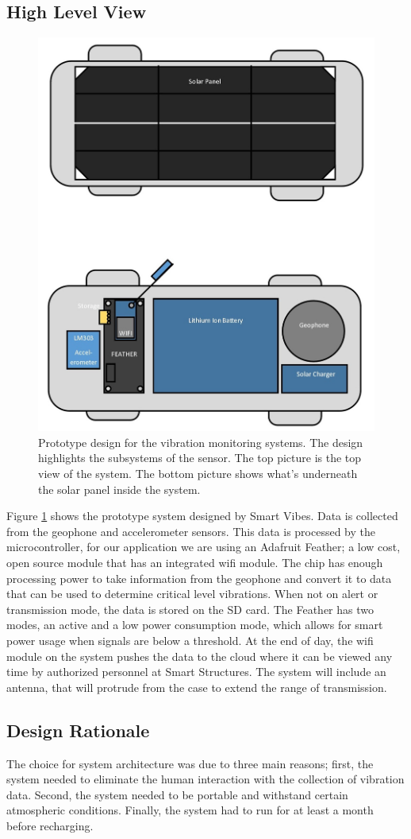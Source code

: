 \documentclass[12pt]{article}
\begin{document}
\subsection{High Level View}
\begin{figure}[H]
    \centering
    \includegraphics[width=.6\textwidth]{src/design_v2.jpg}
    \caption{Prototype design for the vibration monitoring systems. The design highlights the subsystems of the sensor. The top picture is the top view of the system. The bottom picture shows what's underneath the solar panel inside the system.}
    \label{fig:design_v2}
\end{figure}

Figure \ref{fig:design_v2} shows the prototype system designed by Smart Vibes. Data is collected from the geophone and accelerometer sensors. This data is processed by the microcontroller, for our application we are using an Adafruit Feather; a low cost, open source module that has an integrated wifi module. The chip has enough processing power to take information from the geophone and convert it to data that can be used to determine critical level vibrations. When not on alert or transmission mode, the data is stored on the SD card. The Feather has two modes, an active and a low power consumption mode, which allows for smart power usage when signals are below a threshold. At the end of day, the wifi module on the system pushes the data to the cloud where it can be viewed any time by authorized personnel at Smart Structures. The system will include an antenna, that will protrude from the case to extend the range of transmission.

\subsection{Design Rationale}
The choice for system architecture was due to three main reasons; first, the system needed to eliminate the human interaction with the collection of vibration data. Second, the system needed to be portable and withstand certain atmospheric conditions. Finally, the system had to run for at least a month before recharging.
\end{document}
